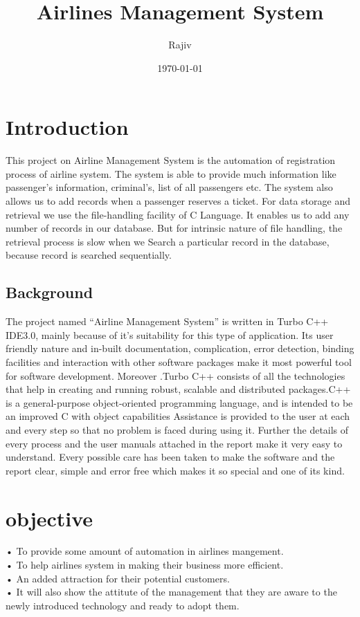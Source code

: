 \documentclass{report}
\title{Airlines Management System}
\author{Rajiv}
\date{\today}
\begin{document}
\maketitle
\tableofcontents
\chapter{Introduction}
This project on Airline Management System is the automation of registration process of airline system. The system is able to provide much information like passenger’s information, criminal’s, list of all passengers etc. The system also allows us to add records when a passenger reserves a ticket. For data storage and retrieval we use the file-handling facility of C Language. It enables us to add any number of records in our database. But for intrinsic nature of file handling, the retrieval process is slow when we
Search a particular record in the database, because record  is searched sequentially.
\section{Background}
The project named “Airline Management System” is written in Turbo C++ IDE3.0, mainly because of it’s suitability for this type of application. Its user friendly nature and in-built documentation, complication, error detection, binding facilities and interaction with other software packages make it most powerful tool for software development. Moreover .Turbo C++ consists of all the technologies that help in creating and running robust, scalable and distributed packages.C++ is a general-purpose object-oriented programming language, and is intended to be an improved C with object capabilities
Assistance is provided to the user at each and every step so that no problem is faced during using it. Further the details of every process and the user manuals attached in the report make it very easy to understand. Every possible care has been taken to make the software and the report clear, simple and error free which makes it so special and one of its kind.
\chapter{objective}
    • To provide some amount of automation in  airlines mangement.\\
    • To help airlines system in making their business more efficient.\\
    • An added attraction for their potential customers.\\
    • It will also show the attitute of the management that they are aware to the newly
      introduced technology and ready to adopt them.
\end{document}
